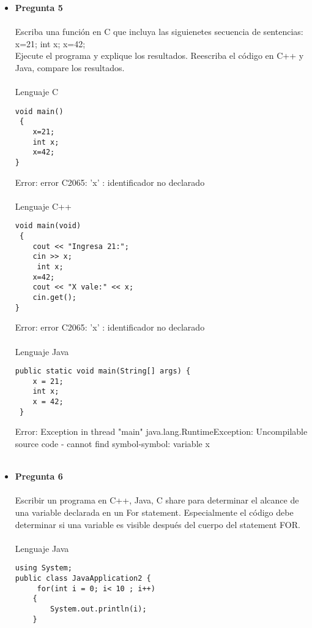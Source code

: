 \documentclass[12pt,oneside]{article}
\begin{document}
\begin{itemize}
\item {\bf Pregunta 5} \\\\
Escriba una función en C que incluya las siguienetes secuencia de sentencias:\\
x=21;
int x;
x=42;\\
Ejecute el programa y explique los resultados. Reescriba el código en C++ y Java, compare los resultados.\\\\
Lenguaje C\\
\begin{lstlisting}[frame=single]
void main()
 {
 	x=21;
	int x;
	x=42;
}
\end{lstlisting}
Error:  error C2065: 'x' : identificador no declarado\\\\
Lenguaje C++
\begin{lstlisting}[frame=single]
void main(void)
 {
 	cout << "Ingresa 21:";
 	cin >> x;
 	 int x;
 	x=42;
 	cout << "X vale:" << x;
 	cin.get();
}
\end{lstlisting}
Error: error C2065: 'x' : identificador no declarado \\\\
Lenguaje Java
\begin{lstlisting}[frame=single]
 public static void main(String[] args) {         
    x = 21;
    int x;
    x = 42;        
 }
\end{lstlisting}
Error: Exception in thread "main" java.lang.RuntimeException: Uncompilable source code - cannot find symbol-symbol: variable x\\\\ 

\item {\bf Pregunta 6} \\\\
Escribir un programa en C++, Java, C share para determinar el alcance de una variable declarada en un For statement. Especialmente el código debe determinar si una variable es visible después del cuerpo del statement FOR.\\\\

Lenguaje Java\\
\begin{lstlisting}[frame=single]  % Start your code-block
using System;
public class JavaApplication2 {
	 for(int i = 0; i< 10 ; i++)
	{
 		System.out.println(i);
	}
 	

\end{lstlisting}
\end{itemize}
\end{document}
